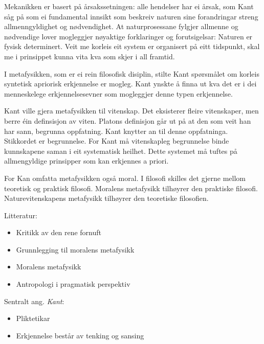 \documentclass[a4paper]{IEEEtran}
\begin{document}
Mekanikken er basert på årsakssetningen: alle hendelser har ei årsak, som Kant såg på som ei fundamental innsikt som beskreiv naturen sine forandringar streng allmenngyldighet og nødvendighet. At naturprosessane fylgjer allmenne og nødvendige lover mogleggjer nøyaktige forklaringer og forutsigelsar: Naturen er fysisk determinert. Veit me korleis eit system er organisert på eitt tidspunkt, skal me i prinsippet kunna vita kva som skjer i all framtid.\bigskip

I metafysikken, som er ei rein filosofisk disiplin, stilte Kant spørsmålet om korleis syntetisk apriorisk erkjennelse er mogleg. Kant ynskte å finna ut kva det er i dei menneskelege erkjennelsesevner som mogleggjer denne typen erkjennelse.\bigskip

Kant ville gjera metafysikken til vitenskap. Det eksisterer fleire vitenskaper, men berre éin definsisjon av viten. Platons definisjon går ut på at den som veit han har sann, begrunna oppfatning. Kant knytter an til denne oppfatninga. Stikkordet er begrunnelse. For Kant må vitenskapleg begrunnelse binde kunnskapene saman i eit systematisk heilhet. Dette systemet må tuftes på allmengyldige prinsipper som kan erkjennes a priori.\bigskip

For Kan omfatta metafysikken også moral. I filosofi skilles det gjerne mellom teoretisk og praktisk filosofi. Moralens metafysikk tilhøyrer den praktiske filosofi. Naturevitenskapens metafysikk tilhøyrer den teoretiske filosofien.\bigskip

\begin{center}
Litteratur:
\end{center}
\begin{itemize}
    \item Kritikk av den rene fornuft
    \item Grunnlegging til moralens metafysikk
    \item Moralens metafysikk
    \item Antropologi i pragmatisk perspektiv
\end{itemize}\bigskip 

\begin{center}
Sentralt ang. \textit{Kant}:
\end{center}
\begin{itemize}\bigskip
    \item Pliktetikar
    \item Erkjennelse består av tenking og sansing
\end{itemize}\bigskip
\end{document}
